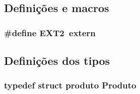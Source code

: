 \subsection{Definições e macros}
\hypertarget{_p-_produtos_8h_ad7b65f22fe3a91d067e8ed32676ef2f5}{
\subsubsection[{E\-X\-T2}]{\setlength{\rightskip}{0pt plus 5cm}\#define E\-X\-T2~extern}}\label{_p-_produtos_8h_ad7b65f22fe3a91d067e8ed32676ef2f5}


\subsection{Definições dos tipos}
\hypertarget{_p-_produtos_8h_aab5e6b4227111edb38705df89c619b76}{
\subsubsection[{Produto}]{\setlength{\rightskip}{0pt plus 5cm}typedef struct {\bf produto} {\bf Produto}}}\label{_p-_produtos_8h_aab5e6b4227111edb38705df89c619b76}


